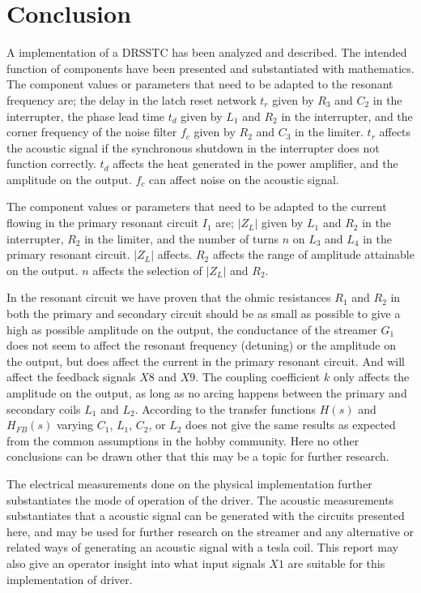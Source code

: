 \chapter{Conclusion}
A implementation of a DRSSTC has been analyzed and described. The intended function of components have been presented and substantiated with mathematics. The component values or parameters that need to be adapted to the resonant frequency are; the delay in the latch reset network $t_r$ given by $R_3$ and $C_2$ in the interrupter, the phase lead time $t_d$ given by $L_1$ and $R_2$ in the interrupter, and the corner frequency of the noise filter $f_c$ given by $R_2$ and $C_3$ in the limiter. $t_r$ affects the acoustic signal if the synchronous shutdown in the interrupter does not function correctly. $t_d$ affects the heat generated in the power amplifier, and the amplitude on the output. $f_c$ can affect noise on the acoustic signal.

The component values or parameters that need to be adapted to the current flowing in the primary resonant circuit $I_1$ are; $|Z_L|$ given by $L_1$ and $R_2$ in the interrupter, $R_2$ in the limiter, and the number of turns $n$ on $L_3$ and $L_4$ in the primary resonant circuit. $|Z_L|$ affects. $R_2$ affects the range of amplitude attainable on the output. $n$ affects the selection of $|Z_L|$ and $R_2$.

In the resonant circuit we have proven that the ohmic resistances $R_1$ and $R_2$ in both the primary and secondary circuit should be as small as possible to give a high as possible amplitude on the output, the conductance of the streamer $G_1$ does not seem to affect the resonant frequency (detuning) or the amplitude on the output, but does affect the current in the primary resonant circuit. And will affect the feedback signals $X8$ and $X9$. The coupling coefficient $k$ only affects the amplitude on the output, as long as no arcing happens between the primary and secondary coils $L_1$ and $L_2$. According to the transfer functions $H(s)$ and $H_{FB}(s)$ varying $C_1$, $L_1$, $C_2$, or $L_2$ does not give the same results as expected from the common assumptions in the hobby community. Here no other conclusions can be drawn other that this may be a topic for further research.

The electrical measurements done on the physical implementation further substantiates the mode of operation of the driver. The acoustic measurements substantiates that a acoustic signal can be generated with the circuits presented here, and may be used for further research on the streamer and any alternative or related ways of generating an acoustic signal with a tesla coil. This report may also give an operator insight into what input signals $X1$ are suitable for this implementation of driver.





